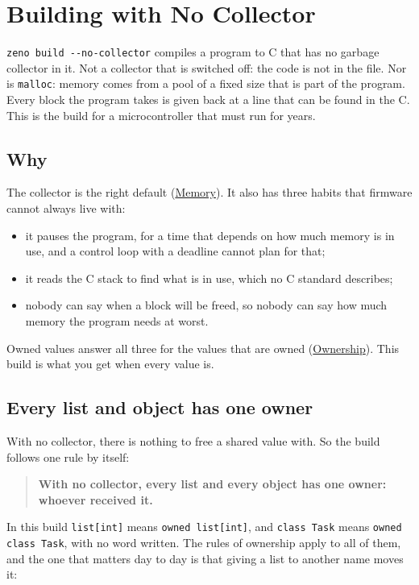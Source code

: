 \chapter{Building with No Collector}\label{ch-no-collector}

\verb|zeno build --no-collector| compiles a program to C that has no
garbage collector in it. Not a collector that is switched off: the
code is not in the file. Nor is \verb|malloc|: memory comes from a pool
of a fixed size that is part of the program. Every block the program
takes is given back at a line that can be found in the C. This is the
build for a microcontroller that must run for years.

\section{Why}

The collector is the right default (\hyperref[ch-memory]{Memory}). It
also has three habits that firmware cannot always live with:

\begin{itemize}
\item it pauses the program, for a time that depends on how much
  memory is in use, and a control loop with a deadline cannot plan for
  that;
\item it reads the C stack to find what is in use, which no C standard
  describes;
\item nobody can say when a block will be freed, so nobody can say how
  much memory the program needs at worst.
\end{itemize}

Owned values answer all three for the values that are owned
(\hyperref[ch-ownership]{Ownership}). This build is what you get when
every value is.

\section{Every list and object has one owner}

With no collector, there is nothing to free a shared value with. So the
build follows one rule by itself:

\begin{quote}
\textbf{With no collector, every list and every object has one owner:
whoever received it.}
\end{quote}

In this build \verb|list[int]| means \verb|owned list[int]|, and
\verb|class Task| means \verb|owned class Task|, with no word written.
The rules of ownership apply to all of them, and the one that matters
day to day is that giving a list to another name moves it:

